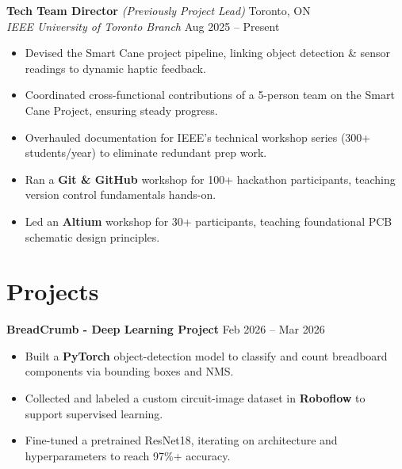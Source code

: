 \documentclass[10pt,letterpaper]{article}
\begin{document}
\vspace{0.25em}
\textbf{Tech Team Director} \textit{(Previously Project Lead)} \hfill 
Toronto, ON \\
\textit{IEEE University of Toronto Branch} \hfill
Aug 2025 -- Present \\
\begin{itemize}
    \item Devised the Smart Cane project pipeline, linking object detection \& sensor readings to dynamic haptic feedback. 
    \item Coordinated cross-functional contributions of a 5-person team on the Smart Cane Project, ensuring steady progress. 
    \item Overhauled documentation for IEEE's technical workshop series (300+ students/year) to eliminate redundant prep work.
    \item Ran a \textbf{Git \& GitHub} workshop for 100+ hackathon participants, teaching version control fundamentals hands-on.
    \item Led an \textbf{Altium} workshop for 30+ participants, teaching foundational PCB schematic design principles.
\end{itemize}




\section{Projects}


\textbf{BreadCrumb - Deep Learning Project} \hfill Feb 2026 -- Mar 2026 \\
\begin{itemize}
    \item Built a \textbf{PyTorch} object-detection model to classify and count breadboard components via bounding boxes and NMS.
    \item Collected and labeled a custom circuit-image dataset in \textbf{Roboflow} to support supervised learning.
    \item Fine-tuned a pretrained ResNet18, iterating on architecture and hyperparameters to reach 97\%+ accuracy.
\end{itemize}
\end{document}

